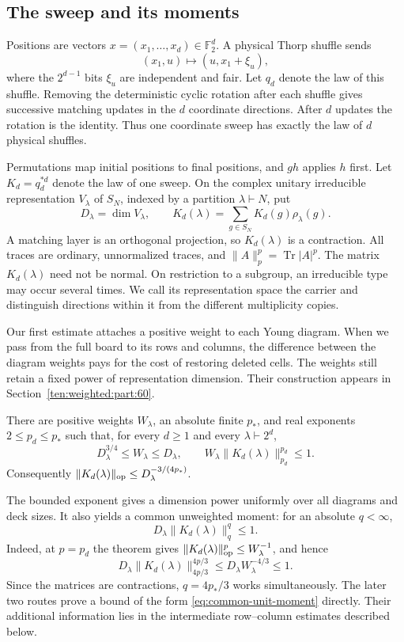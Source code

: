 \subsection{The sweep and its moments}
Positions are vectors $x=(x_1,\ldots,x_d)\in\mathbb F_2^d$. A physical
Thorp shuffle sends
\[
 (x_1,u)\longmapsto(u,x_1+\xi_u),
\]
where the $2^{d-1}$ bits $\xi_u$ are independent and fair. Let $q_d$
denote the law of this shuffle. Removing the
deterministic cyclic rotation after each shuffle gives successive matching
updates in the $d$ coordinate directions. After $d$ updates the rotation
is the identity. Thus one coordinate sweep has exactly the law of $d$
physical shuffles.

Permutations map initial positions to final positions, and $gh$ applies
$h$ first. Let $K_d=q_d^{*d}$ denote the law of one sweep. On the complex unitary
irreducible representation $V_\lambda$ of $S_N$, indexed by a partition
$\lambda\vdash N$, put
\[
 D_\lambda=\dim V_\lambda,\qquad
 K_d(\lambda)=\sum_{g\in S_N}K_d(g)\rho_\lambda(g).
\]
A matching layer is an orthogonal projection, so $K_d(\lambda)$ is a
contraction. All traces are ordinary, unnormalized traces, and
$\|A\|_p^p=\operatorname{Tr}|A|^p$. The matrix $K_d(\lambda)$ need not be
normal. On restriction to a subgroup, an irreducible type may occur
several times. We call its representation space the carrier and distinguish
directions within it from the different multiplicity copies.

Our first estimate attaches a positive weight to each Young diagram.
When we pass from the full board to its rows and columns, the difference
between the diagram weights pays for the cost of restoring deleted cells.
The weights still retain a fixed power of representation dimension.
Their construction appears in Section~\ref{ten:weighted:part:60}.

\begin{theorem}\label{thm:weighted}
There are positive weights $W_\lambda$, an absolute finite $p_*$, and real
exponents $2\le p_d\le p_*$ such that, for every $d\ge1$ and every
$\lambda\vdash2^d$,
\begin{equation}\label{eq:weighted-main}
 D_\lambda^{3/4}\le W_\lambda\le D_\lambda,
 \qquad W_\lambda\|K_d(\lambda)\|_{p_d}^{p_d}\le1.
\end{equation}
Consequently $\|K_d(\lambda)\|_{\rm op}\le D_\lambda^{-3/(4p_*)}$.
\end{theorem}

The bounded exponent gives a dimension power uniformly over all diagrams
and deck sizes. It also yields a common unweighted moment: for an absolute
$q<\infty$,
\begin{equation}\label{eq:common-unit-moment}
 D_\lambda\|K_d(\lambda)\|_q^q\le1.
\end{equation}
Indeed, at $p=p_d$ the theorem gives
$\|K_d(\lambda)\|_{\rm op}^p\le W_\lambda^{-1}$, and hence
\[
 D_\lambda\|K_d(\lambda)\|_{4p/3}^{4p/3}
 \le D_\lambda W_\lambda^{-4/3}\le1.
\]
Since the matrices are contractions, $q=4p_*/3$ works simultaneously.
The later two routes prove a bound of the form
\eqref{eq:common-unit-moment} directly. Their additional information lies
in the intermediate row--column estimates described below.

